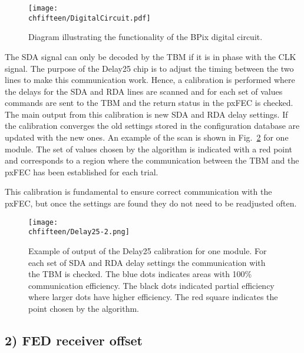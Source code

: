 \begin{figure}[!htb]
 \begin{center}
 \texttt{[image: \\chfifteen/DigitalCircuit.pdf]}
 \end{center}
 \caption{Diagram illustrating the functionality of the BPix digital circuit.}
 \label{fig:DigitalCircuit}
\end{figure}

The SDA signal can only be decoded by the TBM if it is in phase with the CLK signal. The purpose of the Delay25 chip is to adjust the timing between the two lines to make this communication work.
Hence, a calibration is performed where the delays for the SDA and RDA lines are scanned and for each set of values commands are sent to the TBM and the return status in the pxFEC is checked.
The main output from this calibration is new SDA and RDA delay settings. If the calibration converges the old settings stored in the configuration database are updated with the new ones.
An example of the scan is shown in Fig.~\ref{fig:Delay25} for one module.
The set of values chosen by the algorithm is indicated with a red point and corresponds to a region where the communication between the TBM and the pxFEC has been established for each trial.

This calibration is fundamental to ensure correct communication with the pxFEC, but once the settings are found they do not need to be readjusted often.

\begin{figure}[!htb]
 \begin{center}
 \texttt{[image: \\chfifteen/Delay25-2.png]}
 \end{center}
 \caption{Example of output of the Delay25 calibration for one module. For each set of SDA and RDA delay settings the communication with the TBM is checked. The blue dots indicates areas with 100\% communication efficiency. The black dots indicated partial efficiency where larger dots have higher efficiency. The red square indicates the point chosen by the algorithm.}
 \label{fig:Delay25}
\end{figure}

\subsection*{2) FED receiver offset}

